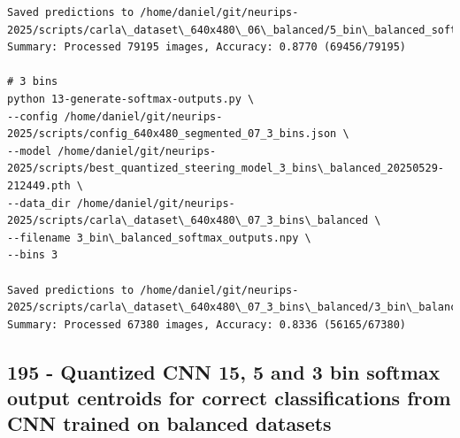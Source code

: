 \begin{verbatim}
Saved predictions to /home/daniel/git/neurips-2025/scripts/carla\_dataset\_640x480\_06\_balanced/5_bin\_balanced_softmax_outputs.npy
Summary: Processed 79195 images, Accuracy: 0.8770 (69456/79195)

# 3 bins
python 13-generate-softmax-outputs.py \
--config /home/daniel/git/neurips-2025/scripts/config_640x480_segmented_07_3_bins.json \
--model /home/daniel/git/neurips-2025/scripts/best_quantized_steering_model_3_bins\_balanced_20250529-212449.pth \
--data_dir /home/daniel/git/neurips-2025/scripts/carla\_dataset\_640x480\_07_3_bins\_balanced \
--filename 3_bin\_balanced_softmax_outputs.npy \
--bins 3 

Saved predictions to /home/daniel/git/neurips-2025/scripts/carla\_dataset\_640x480\_07_3_bins\_balanced/3_bin\_balanced_softmax_outputs.npy
Summary: Processed 67380 images, Accuracy: 0.8336 (56165/67380)

\end{verbatim}

\subsection{195 - Quantized CNN 15, 5 and 3 bin softmax output centroids for correct classifications from CNN trained on balanced datasets}
\label{app_res:195}


